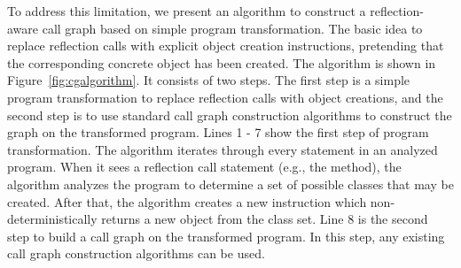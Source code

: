 

To address this limitation, we present an algorithm to construct
a reflection-aware call graph based on simple program transformation.
The basic idea to replace reflection calls with explicit object
creation instructions, pretending that the corresponding concrete object
has been created.  The algorithm is shown in Figure~\ref{fig:cgalgorithm}.
It consists of two steps. The first step is a simple program
transformation to replace reflection calls with object creations, and
the second step is to use standard call graph construction algorithms
to construct the graph on the transformed program. Lines 1 - 7 show
the first step of program transformation. The algorithm iterates through every statement
in an analyzed program. When it sees a reflection call statement (e.g.,
the  method), the algorithm analyzes the
program to determine a set of possible classes that may be created.
After that, the algorithm creates a new instruction which non-deterministically
returns a new object from the class set. Line 8 is the second step
to build a call graph on the transformed program.  In this step,
any existing call graph construction algorithms can be used.

